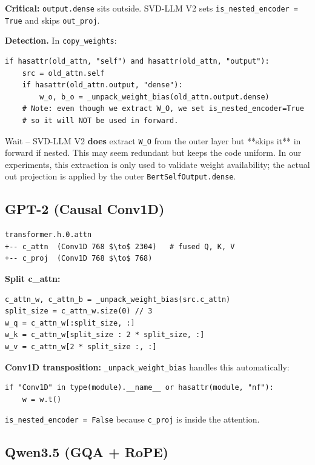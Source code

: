 \textbf{Critical:} \texttt{output.dense} sits outside. SVD-LLM V2 sets 
\texttt{is\_nested\_encoder = True} and skips \texttt{out\_proj}.

\textbf{Detection.} In \texttt{copy\_weights}:

\begin{lstlisting}
if hasattr(old_attn, "self") and hasattr(old_attn, "output"):
    src = old_attn.self
    if hasattr(old_attn.output, "dense"):
        w_o, b_o = _unpack_weight_bias(old_attn.output.dense)
    # Note: even though we extract W_O, we set is_nested_encoder=True
    # so it will NOT be used in forward.
\end{lstlisting}

Wait -- SVD-LLM V2 \textbf{does} extract \texttt{W\_O} from the outer layer but **skips 
it** in forward if nested. This may seem redundant but keeps the code 
uniform. In our experiments, this extraction is only used to validate 
weight availability; the actual out projection is applied by the outer 
\texttt{BertSelfOutput.dense}.

\subsection{GPT-2 (Causal Conv1D)}

\begin{lstlisting}
transformer.h.0.attn
+-- c_attn  (Conv1D 768 $\to$ 2304)   # fused Q, K, V
+-- c_proj  (Conv1D 768 $\to$ 768)
\end{lstlisting}

\textbf{Split c\_attn:}

\begin{lstlisting}
c_attn_w, c_attn_b = _unpack_weight_bias(src.c_attn)
split_size = c_attn_w.size(0) // 3
w_q = c_attn_w[:split_size, :]
w_k = c_attn_w[split_size : 2 * split_size, :]
w_v = c_attn_w[2 * split_size :, :]
\end{lstlisting}

\textbf{Conv1D transposition:} \texttt{\_unpack\_weight\_bias} handles this automatically:

\begin{lstlisting}
if "Conv1D" in type(module).__name__ or hasattr(module, "nf"):
    w = w.t()
\end{lstlisting}

\texttt{is\_nested\_encoder = False} because \texttt{c\_proj} is inside the attention.

\subsection{Qwen3.5 (GQA + RoPE)}

